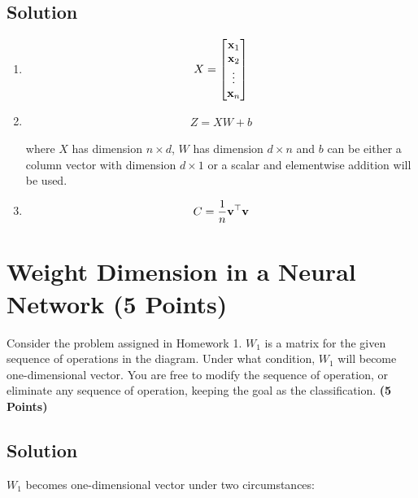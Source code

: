 \documentclass[12pt, xcolor=dvipsnames,svgnames,x11names]{article}
\begin{document}
\subsection{Solution}

\begin{enumerate}
\item 

\begin{align*}
X = \begin{bmatrix}
{\mathbf x}_1 \\ {\mathbf x}_2 \\ \vdots \\ {\mathbf x}_n
\end{bmatrix}
\end{align*}


\item 

\begin{align*}
Z = XW + b
\end{align*}


where $X$ has dimension $n \times d$, $W$ has dimension  $d\times n$ and $b$ can be either a column vector with dimension $d\times 1$ or a scalar and elementwise addition will be used.

\item 

\begin{align*}
C = \frac{1}{n} {\mathbf v}^\top {\mathbf v}
\end{align*} 

\end{enumerate}



\section{Weight Dimension in a Neural Network (5 Points)}

Consider the problem assigned in Homework 1. $W_1$ is a matrix for the given sequence of operations in the diagram. Under what condition, $W_1$ will become one-dimensional vector. You are free to modify the sequence of operation, or eliminate any sequence of operation, keeping the goal as the classification. \hfill \textbf{(5 Points)}

\subsection{Solution}

$W_1$ becomes one-dimensional vector under two circumstances:
\end{document}

